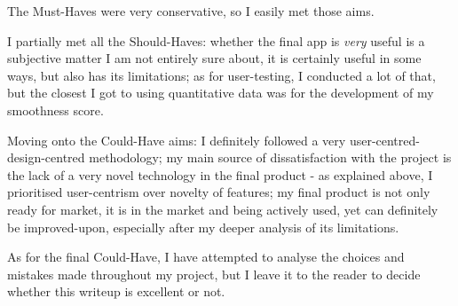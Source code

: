 The Must-Haves were very conservative, so I easily met those aims.

I partially met all the Should-Haves: whether the final app is \textit{very} useful is a subjective matter I am not entirely sure about, it is certainly useful in some ways, but also has its limitations; as for user-testing, I conducted a lot of that, but the closest I got to using quantitative data was for the development of my smoothness score.

Moving onto the Could-Have aims: I definitely followed a very user-centred-design-centred methodology; my main source of dissatisfaction with the project is the lack of a very novel technology in the final product - as explained above, I prioritised user-centrism over novelty of features; my final product is not only ready for market, it is in the market and being actively used, yet can definitely be improved-upon, especially after my deeper analysis of its limitations.

As for the final Could-Have, I have attempted to analyse the choices and mistakes made throughout my project, but I leave it to the reader to decide whether this writeup is excellent or not.







